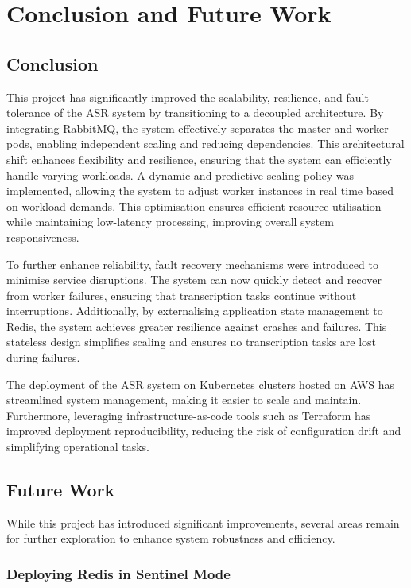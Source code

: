 \chapter{Conclusion and Future Work} \label{chapter:conclusion_and_future_work}

\section{Conclusion}

This project has significantly improved the scalability, resilience, and fault tolerance of the ASR system by transitioning to a decoupled architecture. By integrating RabbitMQ, the system effectively separates the master and worker pods, enabling independent scaling and reducing dependencies. This architectural shift enhances flexibility and resilience, ensuring that the system can efficiently handle varying workloads.
A dynamic and predictive scaling policy was implemented, allowing the system to adjust worker instances in real time based on workload demands. This optimisation ensures efficient resource utilisation while maintaining low-latency processing, improving overall system responsiveness.  

To further enhance reliability, fault recovery mechanisms were introduced to minimise service disruptions. The system can now quickly detect and recover from worker failures, ensuring that transcription tasks continue without interruptions. Additionally, by externalising application state management to Redis, the system achieves greater resilience against crashes and failures. This stateless design simplifies scaling and ensures no transcription tasks are lost during failures.  

The deployment of the ASR system on Kubernetes clusters hosted on AWS has streamlined system management, making it easier to scale and maintain. Furthermore, leveraging infrastructure-as-code tools such as Terraform has improved deployment reproducibility, reducing the risk of configuration drift and simplifying operational tasks.  

\section{Future Work}

While this project has introduced significant improvements, several areas remain for further exploration to enhance system robustness and efficiency.

\subsection{Deploying Redis in Sentinel Mode}

